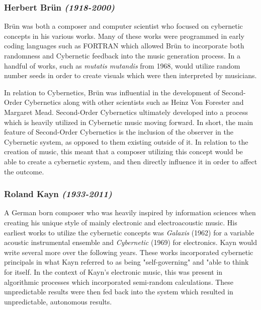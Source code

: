 \subsubsection{Herbert Brün \textit{(1918-2000)}}
Brün was both a composer and computer scientist who focused on cybernetic concepts in his various works. Many of these works were programmed in early coding languages such as FORTRAN which allowed Brün to incorporate both randomness and Cybernetic feedback into the music generation process. In a handful of works, such as \textit{mutatis mutandis} from 1968, would utilize random number seeds in order to create visuals which were then interpreted by musicians.

In relation to Cybernetics, Brün was influential in the development of Second-Order Cybernetics along with other scientists such as Heinz Von Forester and Margaret Mead. Second-Order Cybernetics ultimately developed into a process which is heavily utilized in Cybernetic music moving forward. In short, the main feature of Second-Order Cybernetics is the inclusion of the observer in the Cybernetic system, as opposed to them existing outside of it\cite{Scott_2nd_order_Cyber}. In relation to the creation of music, this meant that a composer utilizing this concept would be able to create a cybernetic system, and then directly influence it in order to affect the outcome.


\subsubsection{Roland Kayn \textit{(1933-2011)}}
A German born composer who was heavily inspired by information sciences when creating his unique style of mainly electronic and electroacoustic music.\cite{rolandKaynBio} His earliest works to utilize the cybernetic concepts was \textit{Galaxis} (1962) for a variable acoustic instrumental ensemble and \textit{Cybernetic} (1969) for electronics. Kayn would write several more over the following years. These works incorporated cybernetic principals in what Kayn referred to as being "self-governing"\cite{rolandKaynBio} and "able to think for itself.\cite{Kayn_Elektroakustische_Projekte} In the context of Kayn's electronic music, this was present in algorithmic processes which incorporated semi-random calculations. These unpredictable results were then fed back into the system which resulted in unpredictable, autonomous results.\cite{rolandKaynBio}


